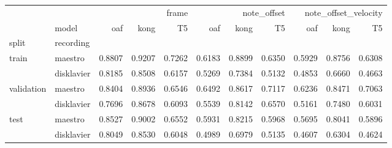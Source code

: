 \begin{tabular}{llrrrrrrrrr}
\toprule
 &  & \multicolumn{3}{r}{frame} & \multicolumn{3}{r}{note_offset} & \multicolumn{3}{r}{note_offset_velocity} \\
 & model & oaf & kong & T5 & oaf & kong & T5 & oaf & kong & T5 \\
split & recording &  &  &  &  &  &  &  &  &  \\
\midrule
\multirow[t]{2}{*}{train} & maestro & 0.8807 & 0.9207 & 0.7262 & 0.6183 & 0.8899 & 0.6350 & 0.5929 & 0.8756 & 0.6308 \\
 & disklavier & 0.8185 & 0.8508 & 0.6157 & 0.5269 & 0.7384 & 0.5132 & 0.4853 & 0.6660 & 0.4663 \\
\cline{1-11}
\multirow[t]{2}{*}{validation} & maestro & 0.8404 & 0.8936 & 0.6546 & 0.6492 & 0.8617 & 0.7117 & 0.6236 & 0.8471 & 0.7063 \\
 & disklavier & 0.7696 & 0.8678 & 0.6093 & 0.5539 & 0.8142 & 0.6570 & 0.5161 & 0.7480 & 0.6031 \\
\cline{1-11}
\multirow[t]{2}{*}{test} & maestro & 0.8527 & 0.9002 & 0.6552 & 0.5931 & 0.8215 & 0.5968 & 0.5695 & 0.8041 & 0.5896 \\
 & disklavier & 0.8049 & 0.8530 & 0.6048 & 0.4989 & 0.6979 & 0.5135 & 0.4607 & 0.6304 & 0.4624 \\
\cline{1-11}
\bottomrule
\end{tabular}
